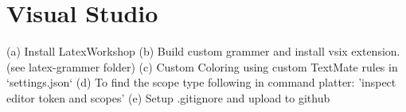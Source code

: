 \chapter{Visual Studio}

\begin{text-note}

(a) Install LatexWorkshop
(b) Build custom grammer and install vsix extension. (see latex-grammer folder)
(c) Custom Coloring using custom TextMate rules in `settings.json`
(d) To find the scope type following in command platter: 'inspect editor token and scopes'
(e) Setup .gitignore and upload to github

\end{text-note}

